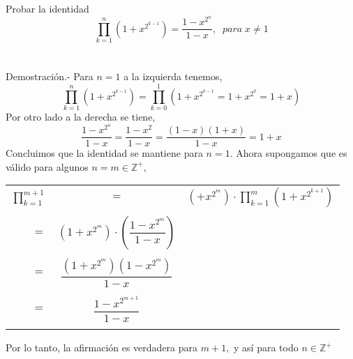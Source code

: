\begin{col.}Probar la identidad
$$\displaystyle\prod_{k=1}^n \left( 1 + x^{2^{k-1}} \right) = \dfrac{1 - x^{2^n}}{1-x}, \; \; para \; x\neq 1$$\\\\
Demostración.- \; Para $n=1$ a la izquierda tenemos,
$$\displaystyle\prod_{k=1}^n \left( 1 + x^{2^{k-1}} \right) = \prod_{k=0}^1 \left( 1 + x^{2^{k-1}} = 1 + x^{2^0} = 1 + x  \right)$$
Por otro lado a la derecha se tiene, $$\dfrac{1- x^{2^n}}{1-x} = \dfrac{1 - x^2}{1-x} = \dfrac{(1-x)(1+x)}{1-x} = 1+x$$
Concluimos que la identidad se mantiene para $n=1$. Ahora supongamos que es válido para algunos $n=m \in \mathbb{Z}^+,$
\begin{center}
\begin{tabular}{r c l}
$\displaystyle\prod_{k=1}^{m+1}$&$=$&$\left( +x^{2^m} \right) \cdot \displaystyle\prod_{k=1}^m \left( 1 + x^{2^{k+1}} \right)$\\\\
$=$&$\left( 1 + x^{2^m} \right) \cdot  \left( \dfrac{1-x^{2^m}}{1-x} \right)$\\\\
$=$&$\dfrac{(1+x^{2^m}) (1- x^{2^m})}{1-x}$\\\\
$=$&$\dfrac{1 - x^{2^{m+1}}}{1-x}$\\\\
\end{tabular}
\end{center} 
Por lo tanto, la afirmación es verdadera para $m+1,$ y así para todo $n \in \mathbb{Z}^+$\\\\
\end{col.}

